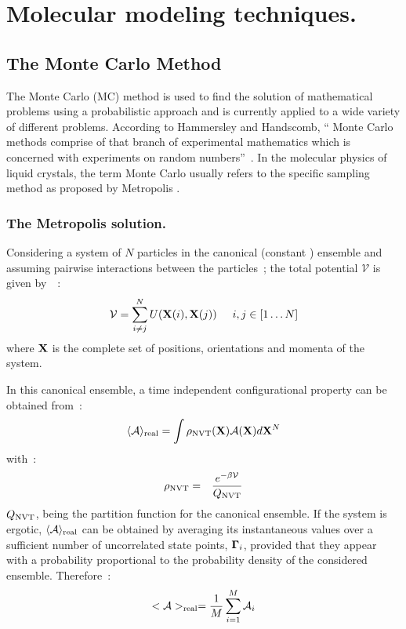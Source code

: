 

\section{Molecular modeling techniques.}


\subsection{The Monte Carlo Method}

The Monte Carlo (MC) method is used to find the solution of mathematical problems 
using a probabilistic approach and is currently applied to a wide variety of different problems.
According to Hammersley and Handscomb, `` Monte Carlo methods comprise of that branch of
experimental mathematics which is concerned with experiments on random numbers''~\cite{MCMethods}.
In the molecular physics of liquid crystals, the term Monte Carlo usually refers to the 
specific sampling method as proposed by Metropolis \etal\cite{MR2T2}.

\subsubsection{The Metropolis solution.}

Considering a system of $N$ particles in the canonical (constant \NVT) ensemble and assuming pairwise
interactions between the particles~; the total potential $\mathcal{V}$ is given
by~\cite{greenBook}~:
\begin{equation}
	\mathcal{V} = \sum_{i\neq j}^{N} U(\mathbf{X}(i), \mathbf{X}(j) ) \hspace*{5mm} i,j\in[1\ldots N]
\end{equation}
where $\mathbf{X}$ is the complete set of positions, orientations and momenta of the system.

In this canonical ensemble, a time independent configurational property can be 
obtained from~:
\begin{equation}
	\langle\mathcal{A}\rangle_{\mathrm{real}} = \int \rho_{\mathrm{NVT}}(\mathbf{X})\mathcal{A}(\mathbf{X})
		d\mathbf{X}^N
\end{equation}
with~:
\begin{eqnarray}
	\rho_{\mathrm{NVT}} &=& \frac{e^{-\beta \mathcal{V}}}{Q_{\mathrm{NVT}}}
\end{eqnarray}
%
$Q_{\mathrm{NVT}}$, being the partition function for the canonical ensemble.
If the system is ergotic, $\langle\mathcal{A}\rangle_{\mathrm{real}}$ can be obtained by averaging its
instantaneous values over a sufficient number of uncorrelated state points, 
$\mathbf{\Gamma}_i$, provided that they appear with a probability proportional to the probability density 
of the considered ensemble. Therefore~:
\begin{equation}
	<\mathcal{A}>_{\mathrm{real}} = \frac{1}{M}\sum_{i=1}^{M} \mathcal{A}_i 
\end{equation}


